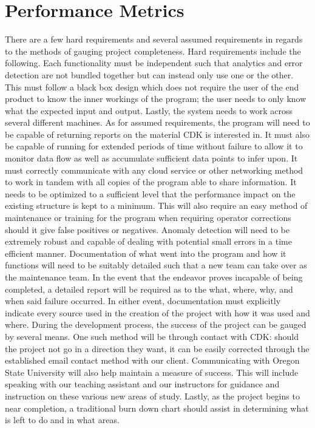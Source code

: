 \documentclass[onecolumn, draftclsnofoot,10pt, compsoc]{IEEEtran}
\begin{document}
\section{Performance Metrics}
	
	There are a few hard requirements and several assumed requirements in regards to the methods of gauging project completeness. Hard requirements include the following. Each functionality must be independent such that analytics and error detection are not bundled together but can instead only use one or the other. This must follow a black box design which does not require the user of the end product to know the inner workings of the program; the user needs to only know what the expected input and output. Lastly, the system needs to work across several different machines. As for assumed requirements, the program will need to be capable of returning reports on the material CDK is interested in. It must also be capable of running for extended periods of time without failure to allow it to monitor data flow as well as accumulate sufficient data points to infer upon. It must correctly communicate with any cloud service or other networking method to work in tandem with all copies of the program able to share information. It needs to be optimized to a sufficient level that the performance impact on the existing structure is kept to a minimum. This will also require an easy method of maintenance or training for the program when requiring operator corrections should it give false positives or negatives. Anomaly detection will need to be extremely robust and capable of dealing with potential small errors in a time efficient manner. Documentation of what went into the program and how it functions will need to be suitably detailed such that a new team can take over as the maintenance team. In the event that the endeavor proves incapable of being completed, a detailed report will be required as to the what, where, why, and when said failure occurred. In either event, documentation must explicitly indicate every source used in the creation of the project with how it was used and where. During the development process, the success of the project can be gauged by several means. One such method will be through contact with CDK: should the project not go in a direction they want, it can be easily corrected through the established email contact method with our client. Communicating with Oregon State University will also help maintain a measure of success. This will include speaking with our teaching assistant and our instructors for guidance and instruction on these various new areas of study. Lastly, as the project begins to near completion, a traditional burn down chart should assist in determining what is left to do and in what areas. 
	
\end{document}
